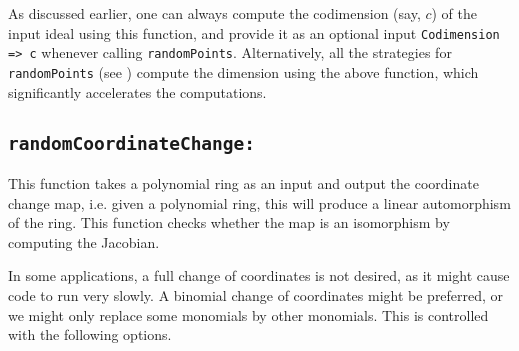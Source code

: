 \documentclass[11pt]{amsart}
\theoremstyle{definition}
\begin{document}
As discussed earlier, one can always compute the codimension (say, $c$) of the input ideal using this function, and provide it as an optional input {\tt Codimension => c} whenever calling {\tt randomPoints}. Alternatively, all the strategies for {\tt randomPoints} (see ) compute the dimension using the above function, which significantly accelerates the computations.

\subsection*{\tt randomCoordinateChange:} 

This function takes a polynomial ring as an input and output the coordinate change map,
i.e. given a polynomial ring, this will produce a linear automorphism of the ring.  This function checks whether the map is an isomorphism by computing the Jacobian.

In some applications, a full change of coordinates is not desired, as it might cause code to run very slowly.  A binomial change of coordinates might be preferred, or we might only replace some monomials by other monomials.  
This is controlled with the following options.
\end{document}
